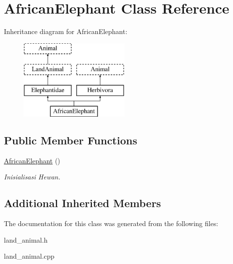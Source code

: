 \hypertarget{class_african_elephant}{}\section{African\+Elephant Class Reference}
\label{class_african_elephant}
Inheritance diagram for African\+Elephant\+:\begin{figure}[H]
\begin{center}
\leavevmode
\includegraphics[height=4.000000cm]{class_african_elephant}
\end{center}
\end{figure}
\subsection*{Public Member Functions}
\begin{DoxyCompactItemize}
\item 
\hyperlink{class_african_elephant_afafb947626644b43e348d085d6a5eb31}{African\+Elephant} ()\hypertarget{class_african_elephant_afafb947626644b43e348d085d6a5eb31}{}\label{class_african_elephant_afafb947626644b43e348d085d6a5eb31}

\begin{DoxyCompactList}\small\item\em Inisialisasi Hewan. \end{DoxyCompactList}\end{DoxyCompactItemize}
\subsection*{Additional Inherited Members}


The documentation for this class was generated from the following files\+:\begin{DoxyCompactItemize}
\item 
land\+\_\+animal.\+h\item 
land\+\_\+animal.\+cpp\end{DoxyCompactItemize}
